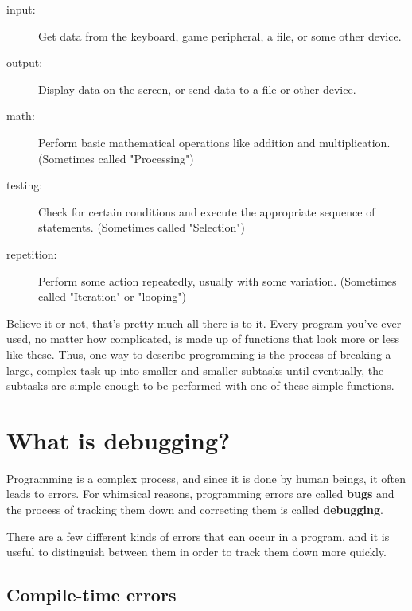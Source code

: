 \begin{description}
\item[input:] Get data from the keyboard, game peripheral, a file, or some
other device.

\item[output:] Display data on the screen, or send data to a file or other device.

\item[math:] Perform basic mathematical operations like addition and
multiplication. (Sometimes called "Processing")

\item[testing:] Check for certain conditions and execute the
appropriate sequence of statements. (Sometimes called "Selection")

\item[repetition:] Perform some action repeatedly, usually with
some variation. (Sometimes called "Iteration" or "looping")


\end{description}

Believe it or not, that's pretty much all there is to it.
Every program you've ever used, no matter how complicated, is
made up of functions that look more or less like these.  Thus,
one way to describe programming is the process of breaking a
large, complex task up into smaller and smaller subtasks
until eventually, the subtasks are simple enough to be performed
with one of these simple functions.

\section{What is debugging?}

Programming is a complex process, and since it is done by
human beings, it often leads to errors.  For whimsical reasons,
programming errors are called {\bf bugs} and the process
of tracking them down and correcting them is called
{\bf debugging}.

There are a few different kinds of errors that can occur
in a program, and it is useful to distinguish between them
in order to track them down more quickly.

\subsection{Compile-time errors}

